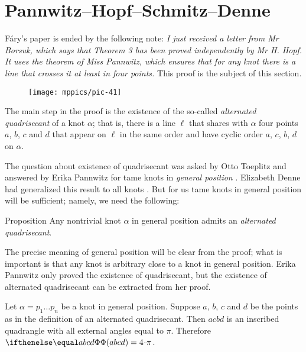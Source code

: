 \section{Pannwitz--Hopf--Schmitz--Denne}\label{sec:quadrisecant}

F\'ary's paper \cite{fary} is ended by the following note:
\textit{I just received a letter from Mr Borsuk, which says that Theorem 3 has been proved independently by Mr H. Hopf.
It uses the theorem of Miss Pannwitz, which ensures that for any knot there is a line that crosses it at least in four
points.}
This proof is the subject of this section.

\begin{wrapfigure}{r}{22 mm}
\vskip-4mm
\centering
\texttt{[image: mppics/pic-41]}
\vskip0mm
\end{wrapfigure}

The main step in the proof is the existence of the so-called \emph{alternated quadrisecant} of a knot $\alpha$; that is, there is a line $\ell$ that shares with $\alpha$ four points $a$, $b$, $c$ and $d$
that appear on $\ell$ in the same order and have cyclic order $a$, $c$, $b$, $d$ on $\alpha$.

The question about existence of quadrisecant was asked by Otto Toep\-litz and answered by Erika Pannwitz for tame knots in \emph{general position} \cite{pannwitz}.
Elizabeth Denne had generalized this result to all knots \cite{denne, denne-survey}.
But for us tame knots in general position will be sufficient;
namely, we need the following:

\begin{thm}{Proposition}\label{prop:quadrisecant}
Any nontrivial knot $\alpha$ in general position admits an \emph{alternated quadrisecant}.
\end{thm}

The precise meaning of general position will be clear from the proof;
what is important is that any knot is arbitrary close to a knot in general position.
Erika Pannwitz only proved the existence of quadrisecant, but the existence of alternated quadrisecant can be extracted from her proof.

Let $\alpha=p_1\dots p_n$ be a knot in general position.
Suppose $a$, $b$, $c$ and $d$ be the points as in the definition of an alternated quadrisecant.
Then $acbd$ is an inscribed quadrangle with all external angles equal to $\pi$.
Therefore $\tc{abcd}=4\cdot\pi$.

